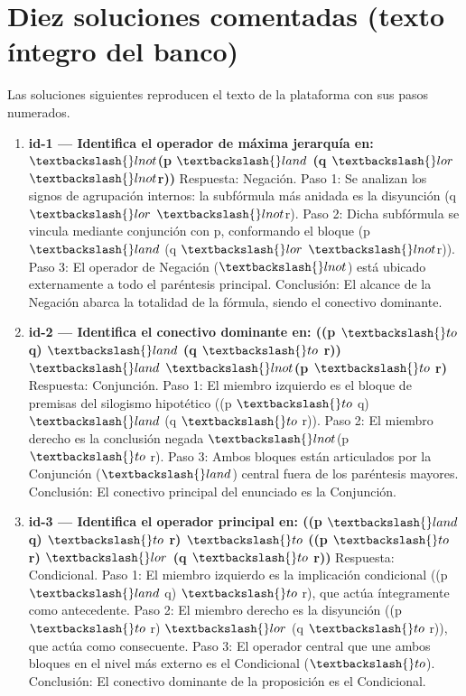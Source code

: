 \documentclass[11pt,a4paper,openany]{book}
\begin{document}
\chapter{Diez soluciones comentadas (texto \'integro del banco)}
\label{ch:sol10full}
Las soluciones siguientes reproducen el texto de la plataforma con sus pasos numerados.
\begin{enumerate}[leftmargin=*]
\item \textbf{id-1 --- Identifica el operador de máxima jerarquía en: $ \textbackslash\{\}lnot $(p $ \textbackslash\{\}land $ (q $ \textbackslash\{\}lor $ $ \textbackslash\{\}lnot $r))} Respuesta: Negación. Paso 1: Se analizan los signos de agrupación internos: la subfórmula más anidada es la disyunción (q $ \textbackslash\{\}lor $ $ \textbackslash\{\}lnot $r). Paso 2: Dicha subfórmula se vincula mediante conjunción con p, conformando el bloque (p $ \textbackslash\{\}land $ (q $ \textbackslash\{\}lor $ $ \textbackslash\{\}lnot $r)). Paso 3: El operador de Negación ($ \textbackslash\{\}lnot $) está ubicado externamente a todo el paréntesis principal. Conclusión: El alcance de la Negación abarca la totalidad de la fórmula, siendo el conectivo dominante.

\item \textbf{id-2 --- Identifica el conectivo dominante en: ((p $ \textbackslash\{\}to $ q) $ \textbackslash\{\}land $ (q $ \textbackslash\{\}to $ r)) $ \textbackslash\{\}land $ $ \textbackslash\{\}lnot $(p $ \textbackslash\{\}to $ r)} Respuesta: Conjunción. Paso 1: El miembro izquierdo es el bloque de premisas del silogismo hipotético ((p $ \textbackslash\{\}to $ q) $ \textbackslash\{\}land $ (q $ \textbackslash\{\}to $ r)). Paso 2: El miembro derecho es la conclusión negada $ \textbackslash\{\}lnot $(p $ \textbackslash\{\}to $ r). Paso 3: Ambos bloques están articulados por la Conjunción ($ \textbackslash\{\}land $) central fuera de los paréntesis mayores. Conclusión: El conectivo principal del enunciado es la Conjunción.

\item \textbf{id-3 --- Identifica el operador principal en: ((p $ \textbackslash\{\}land $ q) $ \textbackslash\{\}to $ r) $ \textbackslash\{\}to $ ((p $ \textbackslash\{\}to $ r) $ \textbackslash\{\}lor $ (q $ \textbackslash\{\}to $ r))} Respuesta: Condicional. Paso 1: El miembro izquierdo es la implicación condicional ((p $ \textbackslash\{\}land $ q) $ \textbackslash\{\}to $ r), que actúa íntegramente como antecedente. Paso 2: El miembro derecho es la disyunción ((p $ \textbackslash\{\}to $ r) $ \textbackslash\{\}lor $ (q $ \textbackslash\{\}to $ r)), que actúa como consecuente. Paso 3: El operador central que une ambos bloques en el nivel más externo es el Condicional ($ \textbackslash\{\}to $). Conclusión: El conectivo dominante de la proposición es el Condicional.


\end{enumerate}
\end{document}
